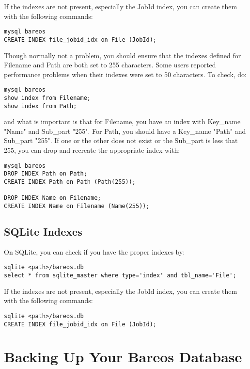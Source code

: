 {If the indexes are not present, especially the JobId index, you can
create them with the following commands:

\footnotesize
\begin{verbatim}
mysql bareos
CREATE INDEX file_jobid_idx on File (JobId);
\end{verbatim}
\normalsize

Though normally not a problem, you should ensure that the indexes
defined for Filename and Path are both set to 255 characters. Some users
reported performance problems when their indexes were set to 50 characters.
To check, do:

\footnotesize
\begin{verbatim}
mysql bareos
show index from Filename;
show index from Path;
\end{verbatim}
\normalsize

and what is important is that for Filename, you have an index with
Key\_name "Name" and Sub\_part "255". For Path, you should have a Key\_name
"Path" and Sub\_part "255".  If one or the other does not exist or the
Sub\_part is less that 255, you can drop and recreate the appropriate
index with:

\footnotesize
\begin{verbatim}
mysql bareos
DROP INDEX Path on Path;
CREATE INDEX Path on Path (Path(255));

DROP INDEX Name on Filename;
CREATE INDEX Name on Filename (Name(255));
\end{verbatim}
\normalsize


\subsection{SQLite Indexes}
On SQLite, you can check if you have the proper indexes by:

\footnotesize
\begin{verbatim}
sqlite <path>/bareos.db
select * from sqlite_master where type='index' and tbl_name='File';
\end{verbatim}
\normalsize

If the indexes are not present, especially the JobId index, you can
create them with the following commands:

\footnotesize
\begin{verbatim}
sqlite <path>/bareos.db
CREATE INDEX file_jobid_idx on File (JobId);
\end{verbatim}
\normalsize
}


\section{Backing Up Your Bareos Database}
\label{BackingUpBareos}

